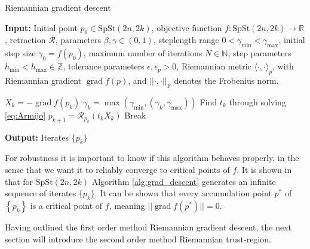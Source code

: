 \begin{algorithm}[H]
    \caption{Riemannian gradient descent}\label{alg:grad_descent}
    \textbf{Input:} Initial point $p_{0}\in \mathrm{SpSt}(2n, 2k)$, objective function $f\colon\mathrm{SpSt}(2n, 2k)\to \mathbb{R}$, retraction $\mathcal{R}$, parameters $\beta, \gamma \in(0,1)$, steplength range $0<\gamma_{\text{min}}<\gamma_{\text{max}}$, initial step size $\gamma_{0}=f(p_{0})$, maximum number of iterations $N\in \mathbb{N}$, step parameters $h_{\text{min}}<h_{\text{max}}\in \mathbb{Z}$, tolerance parameters $\epsilon, \epsilon_{p}>0$, Riemannian metric $\langle \cdot,\cdot \rangle_{p}$, with Riemannian gradient $\operatorname{grad}f(p)$, and $\lvert \lvert \cdot,\cdot \rvert  \rvert_{\text{F}}$ denotes the Frobenius norm.
    \begin{algorithmic}[1]
        \State $X_{k}=-\operatorname{grad}f(p_{k})$
        \State $\gamma_{k}=\operatorname{max}(\gamma_{\text{min}},(\gamma_{k}, \gamma_{\text{max}}))$
        \State Find $t_{k}$ through solving \eqref{eq:Armijo}
        \State $p_{k+1}=\mathcal{R}_{p_{k}}(t_{k}X_{k})$
        \State Break
        \EndIf
        \EndFor
    \end{algorithmic}
    \textbf{Output:} Iterates $\{p_{k}\}$
\end{algorithm}

For robustness it is important to know if this algorithm behaves properly, in the sense that we want it to reliably converge to critical points of $f$. It is shown in \cite[Cor.~5.8]{GaoSonAbsilStykel2021} that for $\mathrm{SpSt}(2n, 2k)$ Algorithm \ref{alg:grad_descent} generates an infinite sequence of iterates $\{p_{k}\} $\cite[Prop.~5.6]{GaoSonAbsilStykel2021}. It can be shown that every accumulation point $p^*$ of $\left\{ p_{k} \right\}$ is a critical point of $f$, meaning $\lvert \lvert\operatorname{grad}f(p^{*})\rvert \rvert=0$. 

Having outlined the first order method Riemannian gradient descent, the next section will introduce the second order method Riemannian trust-region.
